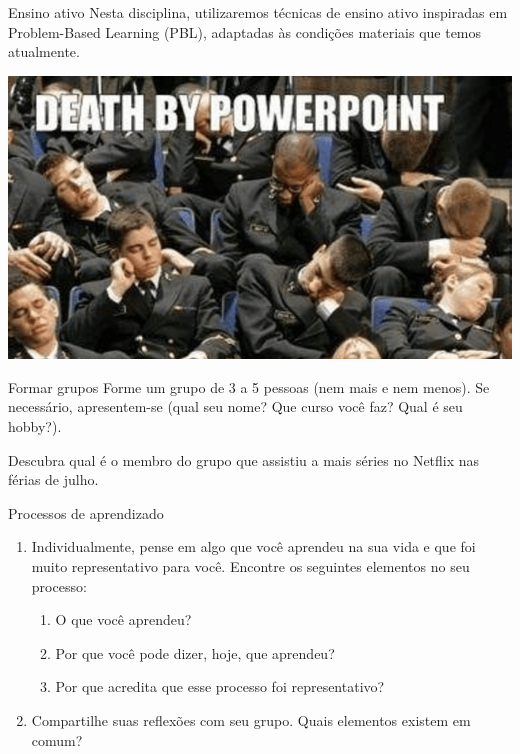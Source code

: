 \documentclass{beamer}
\begin{document}
\begin{frame}{Ensino ativo}
\Large
Nesta disciplina, utilizaremos técnicas de ensino ativo inspiradas em Problem-Based Learning (PBL), adaptadas às condições materiais que temos atualmente.
\end{frame}

\begin{frame}{}
\includegraphics[width=\textwidth]{deathbypowerpoint.png}
\end{frame}

\begin{frame}{Formar grupos}
\Large
Forme um grupo de 3 a 5 pessoas (nem mais e nem menos). Se necessário, apresentem-se (qual seu nome? Que curso você faz? Qual é seu hobby?).

Descubra qual é o membro do grupo que assistiu a mais séries no Netflix nas férias de julho.
\end{frame}

\begin{frame}{Processos de aprendizado}
\Large
\begin{enumerate}
\item Individualmente, pense em algo que você aprendeu na sua vida e que foi muito representativo para você. Encontre os seguintes elementos no seu processo:
\begin{enumerate}
\item O que você aprendeu?
\item Por que você pode dizer, hoje, que aprendeu?
\item Por que acredita que esse processo foi representativo?
\end{enumerate}
\item<2->Compartilhe suas reflexões com seu grupo. Quais elementos existem em comum?
\end{enumerate}
\end{frame}
\end{document}
